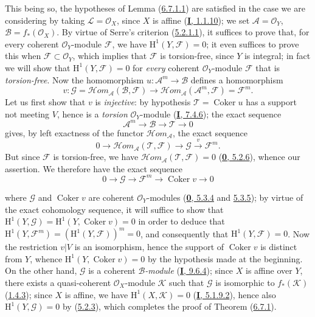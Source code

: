 This being so, the hypotheses of Lemma
(\hyperref[II.6.7.1.1]{6.7.1.1}) are satisfied in the case we are
considering by taking $\mathcal{L}=\mathcal{O}_X$, since $X$ is affine
(\hyperref[I.1.1.10]{\textbf{I}, 1.1.10}); we set
$\mathcal{A}=\mathcal{O}_Y$, $\mathcal{B}=f_*(\mathcal{O}_X)$. By virtue of
Serre's criterion (\hyperref[II.5.2.1.1]{5.2.1.1}), it suffices to prove
that, for every coherent $\mathcal{O}_Y$-module $\mathcal{F}$, we have
$\mathrm{H}^1(Y,\mathcal{F})=0$; it even suffices to prove this when
$\mathcal{F}\subset\mathcal{O}_Y$, which implies that $\mathcal{F}$ is
torsion-free, since $Y$ is integral; in fact we will show that
$\mathrm{H}^1(Y,\mathcal{F})=0$ for \emph{every} coherent
$\mathcal{O}_Y$-module $\mathcal{F}$ that is \emph{torsion-free}. Now the
homomorphism $u:\mathcal{A}^m\to\mathcal{B}$ defines a homomorphism
\[
v:\mathcal{G}
=\mathcal{H}om_{\mathcal{A}}(\mathcal{B},\mathcal{F})
\longrightarrow
\mathcal{H}om_{\mathcal{A}}(\mathcal{A}^m,\mathcal{F})
=\mathcal{F}^m.
\]
Let us first show that $v$ is \emph{injective}: by hypothesis
$\mathcal{T}=\operatorname{Coker}u$ has a support not meeting $V$, hence
is a \emph{torsion} $\mathcal{O}_Y$-module
(\hyperref[I.7.4.6]{\textbf{I}, 7.4.6}); the exact sequence
\[
\mathcal{A}^m\longrightarrow\mathcal{B}\longrightarrow\mathcal{T}
\longrightarrow0
\]
gives, by left exactness of the functor
$\mathcal{H}om_{\mathcal{A}}$, the exact sequence
\[
0\longrightarrow
\mathcal{H}om_{\mathcal{A}}(\mathcal{T},\mathcal{F})
\longrightarrow\mathcal{G}\xrightarrow{v}\mathcal{F}^m.
\]
But since $\mathcal{F}$ is torsion-free, we have
$\mathcal{H}om_{\mathcal{A}}(\mathcal{T},\mathcal{F})=0$
(\hyperref[0.5.2.6]{\textbf{0}, 5.2.6}), whence our assertion. We therefore have
the exact sequence
\[
0\longrightarrow\mathcal{G}\longrightarrow\mathcal{F}^m
\longrightarrow\operatorname{Coker}v\longrightarrow0
\]


where $\mathcal{G}$ and $\operatorname{Coker}v$ are coherent
$\mathcal{O}_Y$-modules
(\hyperref[0.5.3.4]{\textbf{0}, 5.3.4} and
\hyperref[0.5.3.5]{5.3.5}); by virtue of the exact cohomology sequence,
it will suffice to show that
$\mathrm{H}^1(Y,\mathcal{G})
=\mathrm{H}^1(Y,\operatorname{Coker}v)=0$ in order to deduce that
$\mathrm{H}^1(Y,\mathcal{F}^m)
=(\mathrm{H}^1(Y,\mathcal{F}))^m=0$, and consequently that
$\mathrm{H}^1(Y,\mathcal{F})=0$. Now the restriction $v|V$ is an isomorphism,
hence the support of $\operatorname{Coker}v$ is distinct from $Y$, whence
$\mathrm{H}^1(Y,\operatorname{Coker}v)=0$ by the hypothesis made at the
beginning. On the other hand, $\mathcal{G}$ is a coherent \emph{$\mathcal{B}$-module}
(\hyperref[I.9.6.4]{\textbf{I}, 9.6.4}); since $X$ is affine over $Y$, there
exists a quasi-coherent $\mathcal{O}_X$-module $\mathcal{K}$ such that
$\mathcal{G}$ is isomorphic to $f_*(\mathcal{K})$
(\hyperref[II.1.4.3]{1.4.3}); since $X$ is affine, we have
$\mathrm{H}^1(X,\mathcal{K})=0$
(\hyperref[I.5.1.9.2]{\textbf{I}, 5.1.9.2}), hence also
$\mathrm{H}^1(Y,\mathcal{G})=0$ by
(\hyperref[II.5.2.3]{5.2.3}), which completes the proof of Theorem
(\hyperref[II.6.7.1]{6.7.1}).

